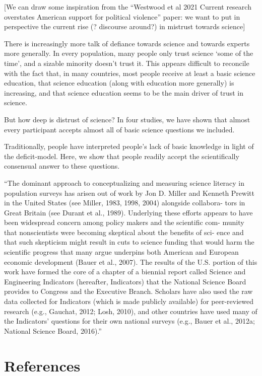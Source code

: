 \documentclass[
  doc,floatsintext]{apa6}
\begin{document}
{[}We can draw some inspiration from the ``Westwood et al 2021 Current research overstates American support for political violence'' paper: we want to put in perspective the current rise (? discourse around?) in mistrust towards science{]}

There is increasingly more talk of defiance towards science and towards experts more generally. In every population, many people only trust science `some of the time', and a sizable minority doesn't trust it. This appears difficult to reconcile with the fact that, in many countries, most people receive at least a basic science education, that science education (along with education more generally) is increasing, and that science education seems to be the main driver of trust in science.

But how deep is distrust of science? In four studies, we have shown that almost every participant accepts almost all of basic science questions we included.

Traditionally, people have interpreted people's lack of basic knowledge in light of the deficit-model. Here, we show that people readily accept the scientifically consensual answer to these questions.

``The dominant approach to conceptualizing and measuring science literacy in population surveys has arisen out of work by Jon D. Miller and Kenneth Prewitt in the United States (see Miller, 1983, 1998, 2004) alongside collabora- tors in Great Britain (see Durant et al., 1989). Underlying these efforts appears to have been widespread concern among policy makers and the scientific com- munity that nonscientists were becoming skeptical about the benefits of sci- ence and that such skepticism might result in cuts to science funding that would harm the scientific progress that many argue underpins both American and European economic development (Bauer et al., 2007). The results of the U.S. portion of this work have formed the core of a chapter of a biennial report called Science and Engineering Indicators (hereafter, Indicators) that the National Science Board provides to Congress and the Executive Branch. Scholars have also used the raw data collected for Indicators (which is made publicly available) for peer-reviewed research (e.g., Gauchat, 2012; Losh, 2010), and other countries have used many of the Indicators' questions for their own national surveys (e.g., Bauer et al., 2012a; National Science Board, 2016).''

\FloatBarrier

\section{References}\label{references}
\end{document}
